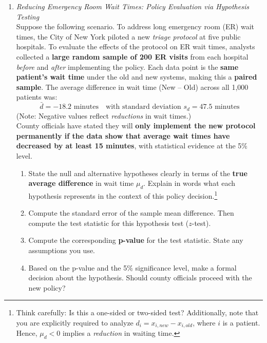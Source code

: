 \documentclass{article}
\begin{document}
\begin{enumerate}
\item \emph{Reducing Emergency Room Wait Times: Policy Evaluation via Hypothesis Testing} \\
        Suppose the following scenario. To address long emergency room (ER) wait times, the City of New York piloted a new \emph{triage protocol} at five public hospitals. To evaluate the effects of the protocol on ER wait times, analysts collected a \textbf{large random sample of 200 ER visits} from each hospital \emph{before} and \emph{after} implementing the policy. Each data point is the \textbf{same patient's wait time} under the old and new systems, making this a \textbf{paired sample}. The average difference in wait time (New – Old) across all 1,000 patients was:
        \[
        \bar{d} = -18.2 \text{ minutes} \quad \text{with standard deviation } s_d = 47.5 \text{ minutes}
        \]
        (Note: Negative values reflect \emph{reductions} in wait times.) \\
        County officials have stated they will \textbf{only implement the new protocol permanently if the data show that average wait times have decreased by at least 15 minutes}, with statistical evidence at the 5\% level.

        \begin{enumerate}[label=(\alph*)]
          \item State the null and alternative hypotheses clearly in terms of the \textbf{true average difference} in wait time \(\mu_d\). Explain in words what each hypothesis represents in the context of this policy decision.\footnote{Think carefully: Is this a one-sided or two-sided test? Additionally, note that you are explicitly required to analyze $d_i = x_{i,new} - x_{i,old}$, where $i$ is a patient. Hence, $\mu_d<0$ implies a \emph{reduction} in waiting time.}

          \item Compute the standard error of the sample mean difference. Then compute the test statistic for this hypothesis test ($z$-test).

          \item Compute the corresponding \textbf{p-value} for the test statistic. State any assumptions you use.

          \item Based on the p-value and the 5\% significance level, make a formal decision about the hypothesis. Should county officials proceed with the new policy?


\end{enumerate}
\end{enumerate}
\end{document}
